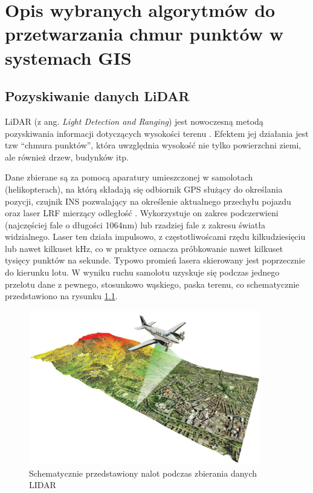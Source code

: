 \chapter{Opis wybranych algorytmów do przetwarzania chmur punktów w systemach GIS}

\section{Pozyskiwanie danych LiDAR}
LiDAR (z ang. \textit{Light Detection and Ranging}) jest nowoczesną metodą pozyskiwania informacji dotyczących wysokości terenu \cite{Marmol2003}.
Efektem jej działania jest tzw “chmura punktów”, która uwzględnia wysokość nie tylko powierzchni ziemi, ale również drzew, budynków itp.

Dane zbierane są za pomocą aparatury umieszczonej w samolotach (helikopterach), na którą składają się odbiornik GPS służący do określania
pozycji, czujnik INS pozwalający na określenie aktualnego przechyłu pojazdu oraz laser
LRF mierzący odległość \cite{WBPW2012}. Wykorzystuje on zakres podczerwieni (najczęściej fale o długości 1064nm) lub rzadziej fale z zakresu
światła widzialnego. Laser ten działa impulsowo, z częstotliwoścami rzędu kilkudziesięciu lub nawet kilkuset kHz, co w praktyce oznacza
próbkowanie nawet kilkuset tysięcy punktów na sekunde. Typowo promień lasera skierowany jest poprzecznie do kierunku lotu. W wyniku ruchu samolotu
uzyskuje się podczas jednego przelotu dane z pewnego, stosunkowo wąskiego, paska terenu, co schematycznie przedstawiono na rysunku \ref{fig:lidar}.

\begin{figure}[h!]
\centering
\includegraphics[width=0.9\textwidth]{img/LIDAR.jpg}
\caption{Schematycznie przedstawiony nalot podczas zbierania danych LIDAR}
\label{fig:lidar}
\end{figure}

